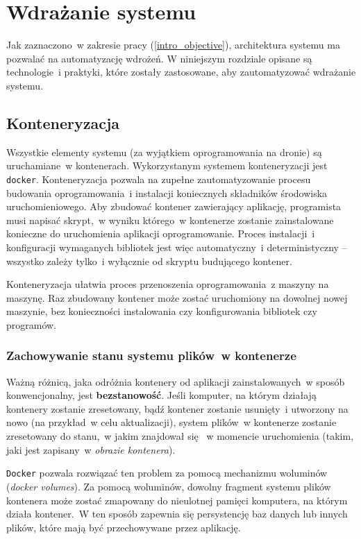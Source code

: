 \chapter{Wdrażanie systemu} \label{chapter_deployment}

Jak zaznaczono~w zakresie pracy (\ref{intro_objective}),
architektura systemu ma pozwalać na automatyzację wdrożeń.
W niniejszym rozdziale opisane są technologie~i praktyki, które zostały 
zastosowane, aby zautomatyzować wdrażanie systemu.

\section{Konteneryzacja}

Wszystkie elementy systemu (za wyjątkiem oprogramowania na dronie) są uruchamiane~w kontenerach.
Wykorzystanym systemem konteneryzacji jest \texttt{docker}\cite{docker}.
Konteneryzacja pozwala na zupełne zautomatyzowanie
procesu budowania oprogramowania~i instalacji koniecznych
składników środowiska uruchomieniowego. Aby zbudować kontener zawierający
aplikację, programista musi napisać skrypt,~w wyniku
którego~w kontenerze zostanie zainstalowane konieczne 
do uruchomienia aplikacji oprogramowanie. Proces instalacji~i konfiguracji
wymaganych bibliotek jest więc automatyczny~i deterministyczny -- wszystko
zależy tylko~i wyłącznie od skryptu budującego kontener.

Konteneryzacja ułatwia proces przenoszenia oprogramowania~z maszyny na maszynę. Raz zbudowany
kontener może zostać uruchomiony na dowolnej nowej maszynie, bez konieczności instalowania 
czy konfigurowania bibliotek czy programów. 

\subsection{Zachowywanie stanu systemu plików~w kontenerze} \label{volumes}

Ważną różnicą, jaka odróżnia kontenery od aplikacji zainstalowanych~w sposób konwencjonalny, jest \textbf{bezstanowość}. Jeśli komputer,
na którym działają kontenery zostanie zresetowany, bądź kontener zostanie
usunięty~i utworzony na nowo (na przykład~w celu aktualizacji), system
plików~w kontenerze zostanie zresetowany do stanu,~w jakim znajdował się ~w momencie uruchomienia (takim, jaki jest zapisany~w \textit{obrazie kontenera}).

\texttt{Docker} pozwala rozwiązać ten problem za pomocą mechanizmu 
woluminów (\textit{docker volumes})\cite{docker_volumes}.
Za pomocą woluminów, dowolny fragment systemu
plików kontenera może zostać zmapowany do nieulotnej pamięci komputera, na którym 
działa kontener.~W ten sposób zapewnia się persystencję baz danych lub innych
plików, które mają być przechowywane przez aplikację.\\ %

